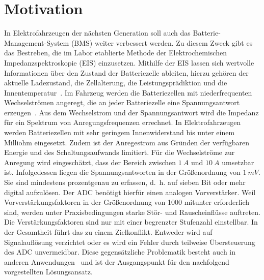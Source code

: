 \section{Motivation}	

In Elektrofahrzeugen der nächsten Generation soll auch das Batterie-Management-System (BMS) weiter verbessert werden. Zu diesem Zweck gibt es das Bestreben, die im Labor etablierte Methode der Elektrochemischen Impedanzspektroskopie (EIS) einzusetzen. Mithilfe der EIS lassen sich wertvolle Informationen über den Zustand der Batteriezelle ableiten, hierzu gehören der aktuelle Ladezustand, die Zellalterung, die Leistungsprädiktion und die Innentemperatur~\cite{Schmidt-2013, Kohs-2022}. Im Fahrzeug werden die Batteriezellen mit niederfrequenten Wechselströmen angeregt, die an jeder Batteriezelle eine Spannungsantwort erzeugen~\cite{KeilJossen-2012, Roscher-2016, Hammerschmidt-2016, Roscher-2015}. Aus dem Wechselstrom und der Spannungsantwort wird die Impedanz für ein Spektrum von Anregungsfrequenzen errechnet. In Elektrofahrzeugen werden Batteriezellen mit sehr geringem Innenwiderstand bis unter einem Milliohm eingesetzt. Zudem ist der Anregestrom aus Gründen der verfügbaren Energie und des Schaltungsaufwands limitiert. Für die Wechselströme zur Anregung wird eingeschätzt, dass der Bereich zwischen $\SI{1}{A}$ und $\SI{10}{A}$ umsetzbar ist. Infolgedessen liegen die Spannungsantworten in der Größenordnung von $\SI{1}{mV}$. Sie sind mindestens prozentgenau zu erfassen, d.~h. auf sieben Bit oder mehr digital aufzulösen. Der ADC benötigt hierfür einen analogen Vorverstärker. Weil Vorverstärkungsfaktoren in der Größenordnung von 1000 mitunter erforderlich sind, werden unter Praxisbedingungen starke Stör- und Rauscheinflüsse auftreten. Die Verstärkungsfaktoren sind nur mit einer begrenzter Stufenzahl einstellbar. In der Gesamtheit führt das zu einem Zielkonflikt. Entweder wird auf Signalauflösung verzichtet oder es wird ein Fehler durch teilweise Übersteuerung des ADC unvermeidbar. Diese gegensätzliche Problematik besteht auch in anderen Anwendungen~\cite{Abel-1991,Ting-2013, Zhou-2019, Chan-2012} und ist der Ausgangspunkt für den nachfolgend vorgestellten Lösungsansatz.

